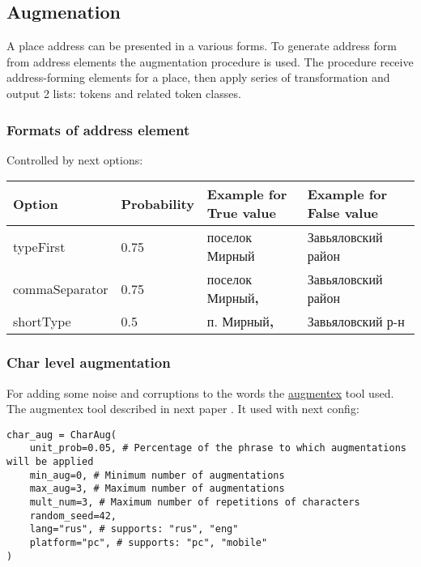 \documentclass{article}
\begin{document}
\subsection{Augmenation}

A place address can be presented in a various forms.
To generate address form from address elements the augmentation procedure is used.
The procedure receive address-forming elements for a place, then apply series of transformation and output 2 lists: tokens and related token classes.

\subsubsection{Formats of address element}

Controlled by next options:

\begin{center}
    \begin{tabular}{| l | l | l |  l | }
        \hline
        Option & Probability & Example for True value & Example for False value \\
        \hline
        typeFirst & 0.75 & поселок Мирный & Завьяловский район  \\
        commaSeparator & 0.75 & поселок Мирный\textbf{,} & Завьяловский район  \\
        shortType & 0.5 & п. Мирный\textbf{,} & Завьяловский р-н  \\
        \hline
    \end{tabular}
\end{center}



\subsubsection{Char level augmentation}

For adding some noise and corruptions to the words the \href{https://github.com/ai-forever/augmentex}{augmentex} tool used.
The augmentex tool described in next paper \cite{martynov2023augmentation}.
It used with next config:

\begin{verbatim}
char_aug = CharAug(
    unit_prob=0.05, # Percentage of the phrase to which augmentations will be applied
    min_aug=0, # Minimum number of augmentations
    max_aug=3, # Maximum number of augmentations
    mult_num=3, # Maximum number of repetitions of characters
    random_seed=42,
    lang="rus", # supports: "rus", "eng"
    platform="pc", # supports: "pc", "mobile"
)

\end{verbatim}
\end{document}

